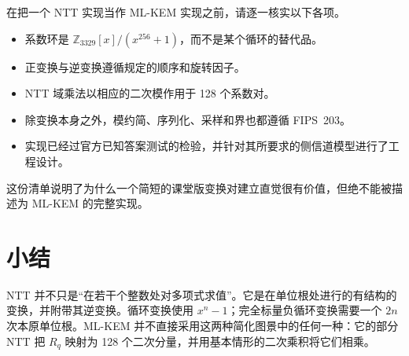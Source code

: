 在把一个 NTT 实现当作 ML-KEM 实现之前，请逐一核实以下各项。
\begin{itemize}
  \item 系数环是 $\mathbb{Z}_{3329}[x]/(x^{256}+1)$，而不是某个循环的替代品。
  \item 正变换与逆变换遵循规定的顺序和旋转因子。
  \item NTT 域乘法以相应的二次模作用于 128 个系数对。
  \item 除变换本身之外，模约简、序列化、采样和界也都遵循 FIPS~203。
  \item 实现已经过官方已知答案测试的检验，并针对其所要求的侧信道模型进行了工程设计。
\end{itemize}

这份清单说明了为什么一个简短的课堂版变换对建立直觉很有价值，但绝不能被描述为 ML-KEM 的完整实现。

\section{小结}

NTT 并不只是“在若干个整数处对多项式求值”。它是在单位根处进行的有结构的变换，并附带其逆变换。循环变换使用 $x^n-1$；完全标量负循环变换需要一个 $2n$ 次本原单位根。ML-KEM 并不直接采用这两种简化图景中的任何一种：它的部分 NTT 把 $R_q$ 映射为 128 个二次分量，并用基本情形的二次乘积将它们相乘。

\printbibliography[heading=chapterrefs]
